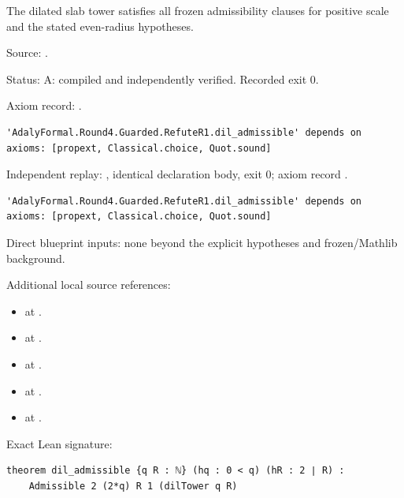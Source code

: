\begin{theorem}[bp-027]
\label{bp-027}
\uses{}
\leanok
The dilated slab tower satisfies all frozen admissibility clauses for positive scale and the stated even-radius hypotheses.

\par Source: \texttt{}.
\par Status: A: compiled and independently verified. Recorded exit 0.
\par Axiom record: \texttt{}.
\begin{verbatim}
'AdalyFormal.Round4.Guarded.RefuteR1.dil_admissible' depends on axioms: [propext, Classical.choice, Quot.sound]
\end{verbatim}
\par Independent replay: \texttt{}, identical declaration body, exit 0; axiom record \texttt{}.
\begin{verbatim}
'AdalyFormal.Round4.Guarded.RefuteR1.dil_admissible' depends on axioms: [propext, Classical.choice, Quot.sound]
\end{verbatim}
\par Direct blueprint inputs: none beyond the explicit hypotheses and frozen/Mathlib background.
\par Additional local source references:
\begin{itemize}
\item \texttt{} at \texttt{}.
\item \texttt{} at \texttt{}.
\item \texttt{} at \texttt{}.
\item \texttt{} at \texttt{}.
\item \texttt{} at \texttt{}.
\end{itemize}
\par Exact Lean signature:
\begin{verbatim}
theorem dil_admissible {q R : ℕ} (hq : 0 < q) (hR : 2 ∣ R) :
    Admissible 2 (2*q) R 1 (dilTower q R)
\end{verbatim}
\end{theorem}


